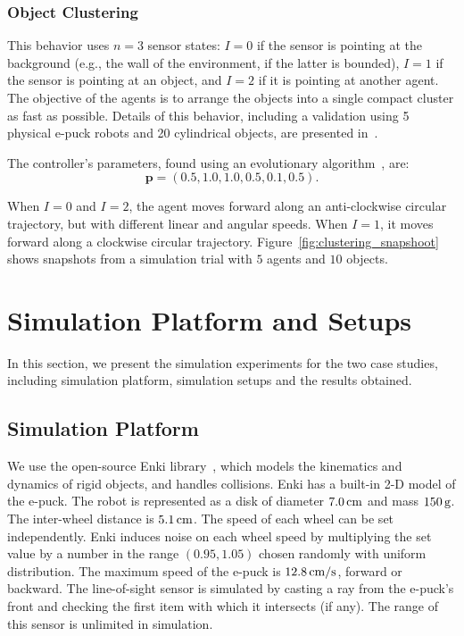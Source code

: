 \subsubsection{Object Clustering}
This behavior uses $n=3$ sensor states: $I=0$ if the sensor is pointing at the background (e.g., the wall of the environment, if the latter is bounded), $I=1$ if the sensor is pointing at an object, and $I=2$ if it is pointing at another agent. The objective of the agents is to arrange the objects into a single compact cluster as fast as possible. Details of this behavior, including a validation using 5 physical e-puck robots and 20 cylindrical objects, are presented in~\cite{Melvin2014_aamas}.

The controller's parameters, found using an evolutionary algorithm~\cite{Melvin2014_aamas}, are:
\begin{equation}\label{eq:clustering_optimal_controller}
\mathbf{p} = \left( 0.5, 1.0, 1.0, 0.5, 0.1, 0.5 \right).
\end{equation} 

When $I=0$ and $I=2$, the agent moves forward along an anti-clockwise circular trajectory, but with different linear and angular speeds. When $I=1$, it moves forward along a clockwise circular trajectory. Figure~\ref{fig:clustering_snapshoot} shows snapshots from a simulation trial with $5$ agents and $10$ objects.

\section{Simulation Platform and Setups}\label{sec:simulation_platform_setups}
 
In this section, we present the simulation experiments for the two case studies, including simulation platform, simulation setups and the results obtained. 

\subsection{Simulation Platform}\label{sec:platform_swarm_simulation}

We use the open-source Enki library~\cite{Enki}, which models the kinematics and dynamics of rigid objects, and handles collisions. Enki has a built-in 2-D model of the e-puck. The robot is represented as a disk of diameter $\unit[7.0]{cm}$ and mass $\unit[150]{g}$. The inter-wheel distance is $\unit[5.1]{cm}$. The speed of each wheel can be set independently. Enki induces noise on each wheel speed by multiplying the set value by a number in the range $(0.95, 1.05)$ chosen randomly with uniform distribution. The maximum speed of the e-puck is $\unit[12.8]{\textrm{cm/s}}$, forward or backward. The line-of-sight sensor is simulated by casting a ray from the e-puck's front and checking the first item with which it intersects (if any). The range of this sensor is unlimited in simulation. 

